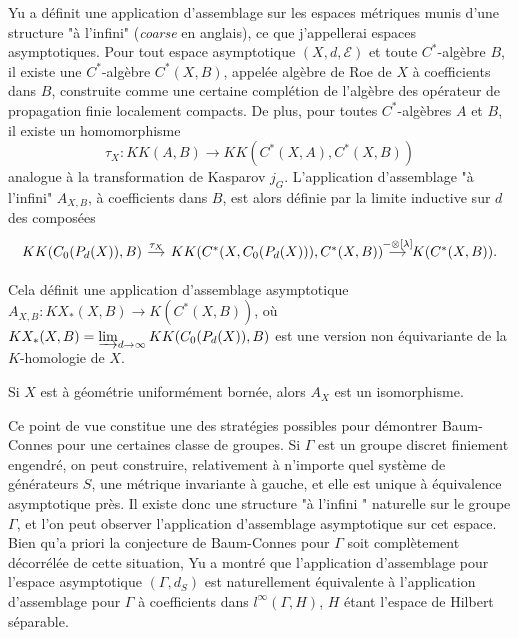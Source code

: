 Yu a définit une application d'assemblage sur les espaces métriques munis d'une structure "à l'infini" (\textit{coarse} en anglais), ce que j'appellerai espaces asymptotiques. Pour tout espace asymptotique $(X,d,\mathcal E)$ et toute $C^*$-algèbre $B$, il existe une $C^*$-algèbre $C^*(X,B)$, appelée algèbre de Roe de $X$ à coefficients dans $B$, construite comme une certaine complétion de l'algèbre des opérateur de propagation finie localement compacts. De plus, pour toutes $C^*$-algèbres $A$ et $B$, il existe un homomorphisme
\[\tau_X : KK(A,B)\rightarrow KK(C^*(X,A),C^*(X,B))\]
analogue à la transformation de Kasparov $j_G$. L'application d'assemblage "à l'infini" $A_{X,B}$, à coefficients dans $B$, est alors définie par la limite inductive sur $d$ des composées
\[\begin{tikzcd}[column sep= small]
KK(C_0(P_d(X)),B)\arrow{r}{\tau_X}& KK(C^*(X,C_0(P_d(X))),C^*(X,B)) \arrow{r}{-\otimes [\lambda]} & K(C^*(X,B)) .
\end{tikzcd}\]

Cela définit une application d'assemblage asymptotique $A_{X,B} : KX_*(X,B)\rightarrow K(C^*(X,B))$, où $KX_*(X,B)=\varinjlim_{d\rightarrow \infty} KK(C_0(P_d(X)),B)$ est une version non équivariante de la $K$-homologie de $X$.
\begin{conj} Si $X$ est à géométrie uniformément bornée, alors $A_X$ est un isomorphisme.
\end{conj}

Ce point de vue constitue une des stratégies possibles pour démontrer Baum-Connes pour une certaines classe de groupes. Si $\Gamma$ est un groupe discret finiement engendré, on peut construire, relativement à n'importe quel système de générateurs $S$, une métrique invariante à gauche, et elle est unique à équivalence asymptotique près. Il existe donc une structure "à l'infini " naturelle sur le groupe $\Gamma$, et l'on peut observer l'application d'assemblage asymptotique sur cet espace. Bien qu'a priori la conjecture de Baum-Connes pour $\Gamma$ soit complètement décorrélée de cette situation, Yu a montré que l'application d'assemblage pour l'espace asymptotique $(\Gamma, d_S)$ est naturellement équivalente à l'application d'assemblage pour $\Gamma$ à coefficients dans $l^\infty(\Gamma, H)$, $H$ étant l'espace de Hilbert séparable.















